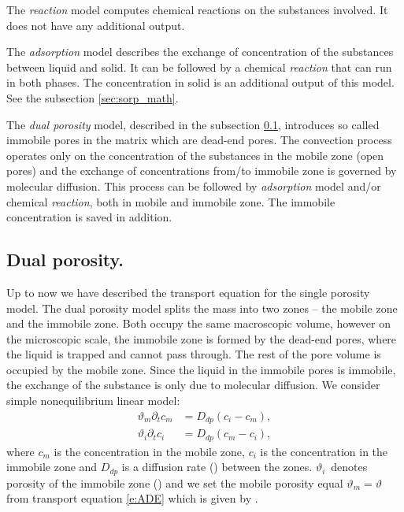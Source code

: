 The \emph{reaction} model computes chemical reactions on the substances involved. It does not have any additional output.

The \emph{adsorption} model describes the exchange of concentration of the substances between liquid and solid. It can be
followed by a chemical \emph{reaction} that can run in both phases. The concentration in solid is an additional output 
of this model. See the subsection \ref{sec:sorp_math}.


The \emph{dual porosity} model, described in the subsection \ref{sec:dual_porosity}, introduces so called immobile pores in the matrix
which are dead-end pores. The convection process operates only on the concentration of the substances in the mobile zone (open pores) 
and the exchange of concentrations from/to immobile zone is governed by molecular diffusion. This process can be followed by 
\emph{adsorption} model and/or chemical \emph{reaction}, both in mobile and immobile zone. The immobile concentration is saved
in addition.


\subsection{Dual porosity.}
\label{sec:dual_porosity}

Up to now we have described the transport equation for the single porosity model. The dual porosity model splits the mass into 
two zones -- the mobile zone and the immobile zone. Both occupy the same macroscopic volume, however on the microscopic scale, 
the immobile zone is formed by the dead-end pores, where the liquid is trapped and cannot pass through. The rest of the pore volume 
is occupied by the mobile zone. Since the liquid in the immobile pores is immobile, the exchange of the substance is only due 
to molecular diffusion. We consider simple nonequilibrium linear model:
\begin{align}
    \vartheta_m \partial_t c_m &= D_{dp} ( c_i - c_m), \label{eqn:dual_porosity_ode1}\\
    \vartheta_i \partial_t c_i &= D_{dp} ( c_m - c_i), \label{eqn:dual_porosity_ode2}
\end{align}
where $c_m$ is the concentration in the mobile zone, $c_i$ is the concentration in the immobile zone and
$D_{dp}$ is a diffusion rate () between the zones.
$\vartheta_i$~denotes porosity of the immobile zone () and 
we set the mobile porosity equal $\vartheta_m = \vartheta$ from transport equation \eqref{e:ADE} which is given by
.

